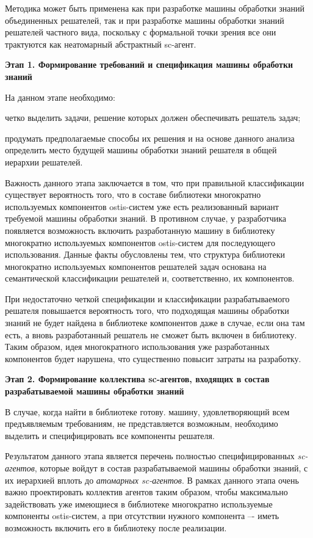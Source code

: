Методика может быть применена как при разработке машины обработки знаний объединенных решателей, так и при разработке машины обработки знаний решателей частного вида, поскольку с формальной точки зрения все они трактуются как неатомарный абстрактный sc-агент.

\textbf{Этап 1. Формирование требований и спецификация машины обработки знаний}

На данном этапе необходимо:
\begin{textitemize}
\item четко выделить задачи, решение которых должен обеспечивать решатель задач;
\item продумать предполагаемые способы их решения и на основе данного анализа определить место будущей машины обработки знаний решателя в общей иерархии решателей.
\end{textitemize}

Важность данного этапа заключается в том, что при правильной классификации существует вероятность того, что в составе библиотеки многократно используемых компонентов ostis-систем уже есть реализованный вариант требуемой машины обработки знаний. В противном случае, у разработчика появляется возможность включить разработанную машину в библиотеку многократно используемых компонентов ostis-систем для последующего использования. Данные факты обусловлены тем, что структура библиотеки многократно используемых компонентов решателей задач основана на семантической классификации решателей и, соответственно, их компонентов.

При недостаточно четкой спецификации и классификации разрабатываемого решателя повышается вероятность того, что подходящая машины обработки знаний не будет найдена в библиотеке компонентов даже в случае, если она там есть, а вновь разработанный решатель не сможет быть включен в библиотеку. Таким образом, идея многократного использования уже разработанных компонентов будет нарушена, что существенно повысит затраты на разработку.

\textbf{Этап 2. Формирование коллектива sc-агентов, входящих в состав разрабатываемой машины обработки знаний}

В случае, когда найти в библиотеке готову. машину, удовлетворяющий всем предъявляемым требованиям, не представляется возможным, необходимо выделить и специфицировать все компоненты решателя.

Результатом данного этапа является перечень полностью специфицированных \textit{sc-агентов}, которые войдут в состав разрабатываемой машины обработки знаний, с их иерархией вплоть до \textit{атомарных sc-агентов}. В рамках данного этапа очень важно проектировать коллектив агентов таким образом, чтобы максимально задействовать уже имеющиеся в библиотеке многократно используемые компоненты ostis-систем, а при отсутствии нужного компонента –- иметь возможность включить его в библиотеку после реализации.

